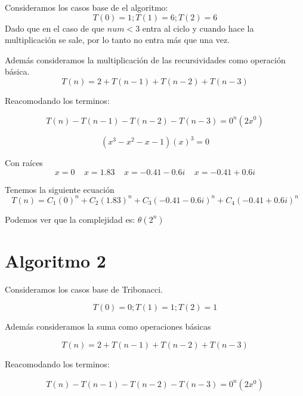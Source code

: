 \documentclass[12pt, fleqn]{article}                             %
\theoremstyle{break}                                            %
\begin{document}
Consideramos los casos base de el algoritmo:
\begin{equation*}
    T(0)=1;T(1)=6; T(2)=6
\end{equation*}
Dado que en el caso de que $num<3$ entra al ciclo y cuando hace la multiplicación se sale, por lo tanto no entra más que una vez.

Además consideramos la multiplicación de las recursividades como operación básica.
\begin{equation*}
    T(n)=2+T(n-1)+T(n-2)+T(n-3)
\end{equation*}

Reacomodando los terminos:

\begin{equation*}
    T(n)-T(n-1)-T(n-2)-T(n-3)=0^n(2x^0)
\end{equation*}

\begin{equation*}
    (x^3-x^2-x-1)(x)^3=0
\end{equation*}

Con raíces
\begin{equation*}
    x=0\:\:\:\:\: x=1.83 \:\:\:\:\: x=-0.41-0.6i \:\:\:\:\: x=-0.41+0.6i
\end{equation*}

Tenemos la siguiente ecuación
\begin{equation*}
   T(n)=C_1(0)^n+C_2(1.83)^n+C_3(-0.41-0.6i)^n+C_4(-0.41+0.6i)^n
\end{equation*}

Podemos ver que la complejidad es:
$\theta(2^n)$


\section{Algoritmo 2}


Consideramos los casos base de Tribonacci.

\begin{equation*}
    T(0)=0; T(1)=1;T(2)=1
    \end{equation*}

Además consideramos la suma como operaciones básicas

\begin{equation*}
    T(n)=2+T(n-1)+T(n-2)+T(n-3)
\end{equation*}

Reacomodando los terminos:

\begin{equation*}
    T(n)-T(n-1)-T(n-2)-T(n-3)=0^n(2x^0)
\end{equation*}
\end{document}
